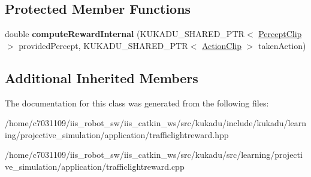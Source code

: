 \subsection*{Protected Member Functions}
\begin{DoxyCompactItemize}
\item 
\hypertarget{classkukadu_1_1TrafficLightReward_a83bc35d64504a8f16f4157c8b56715d9}{double {\bfseries compute\-Reward\-Internal} (K\-U\-K\-A\-D\-U\-\_\-\-S\-H\-A\-R\-E\-D\-\_\-\-P\-T\-R$<$ \hyperlink{classkukadu_1_1PerceptClip}{Percept\-Clip} $>$ provided\-Percept, K\-U\-K\-A\-D\-U\-\_\-\-S\-H\-A\-R\-E\-D\-\_\-\-P\-T\-R$<$ \hyperlink{classkukadu_1_1ActionClip}{Action\-Clip} $>$ taken\-Action)}\label{classkukadu_1_1TrafficLightReward_a83bc35d64504a8f16f4157c8b56715d9}

\end{DoxyCompactItemize}
\subsection*{Additional Inherited Members}


The documentation for this class was generated from the following files\-:\begin{DoxyCompactItemize}
\item 
/home/c7031109/iis\-\_\-robot\-\_\-sw/iis\-\_\-catkin\-\_\-ws/src/kukadu/include/kukadu/learning/projective\-\_\-simulation/application/trafficlightreward.\-hpp\item 
/home/c7031109/iis\-\_\-robot\-\_\-sw/iis\-\_\-catkin\-\_\-ws/src/kukadu/src/learning/projective\-\_\-simulation/application/trafficlightreward.\-cpp\end{DoxyCompactItemize}
